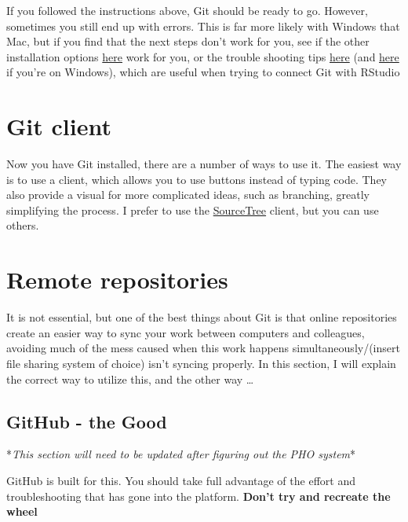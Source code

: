 \documentclass[]{book}
\begin{document}
If you followed the instructions above, Git should be ready to go. However, sometimes you still end up with errors. This is far more likely with Windows that Mac, but if you find that the next steps don't work for you, see if the other installation options \href{https://happyGitwithr.com/install-Git.html}{here} work for you, or the trouble shooting tips \href{https://happyGitwithr.com/troubleshooting.html}{here} (and \href{https://Github.com/jennybc/happy-Git-with-r/issues/67}{here} if you're on Windows), which are useful when trying to connect Git with RStudio

\hypertarget{git-client}{%
\section{Git client}\label{git-client}}

Now you have Git installed, there are a number of ways to use it. The easiest way is to use a client, which allows you to use buttons instead of typing code. They also provide a visual for more complicated ideas, such as branching, greatly simplifying the process. I prefer to use the \href{https://www.sourcetreeapp.com/}{SourceTree} client, but you can use others.

\hypertarget{remote-repositories}{%
\section{Remote repositories}\label{remote-repositories}}

It is not essential, but one of the best things about Git is that online repositories create an easier way to sync your work between computers and colleagues, avoiding much of the mess caused when this work happens simultaneously/(insert file sharing system of choice) isn't syncing properly. In this section, I will explain the correct way to utilize this, and the other way \ldots{}

\hypertarget{github---the-good}{%
\subsection{GitHub - the Good}\label{github---the-good}}

*\emph{This section will need to be updated after figuring out the PHO system}*

GitHub is built for this. You should take full advantage of the effort and troubleshooting that has gone into the platform. \textbf{Don't try and recreate the wheel}
\end{document}

